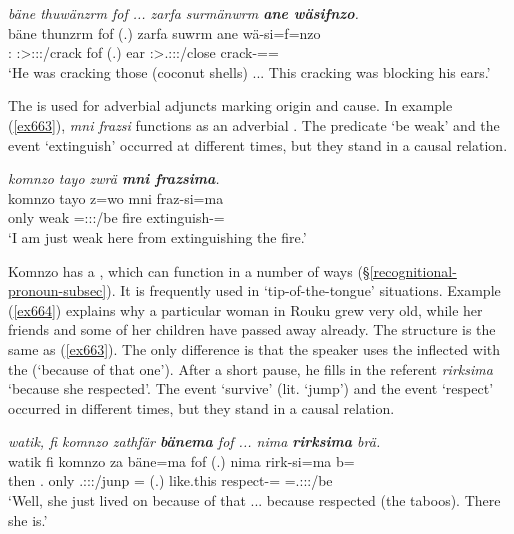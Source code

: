 \begin{exe}
	\ex \emph{bäne thuwänzrm fof ... zarfa surmänwrm \textbf{ane wäsifnzo}.}\\
	\gll bäne thunzrm fof (.) zarfa suwrm ane wä-si=f=nzo\\
	\Dem:\Med{} \Stsg:\Sbj>\Stpl:\Obj:\Pst:\Dur/crack fof (.) ear \Stsg:\Sbj>\Tsg.\Masc:\Obj:\Pst:\Dur/close {\Dem} crack-\Nmlz=\Erg=\Only\\
	\trans `He was cracking those (coconut shells) ... This cracking was blocking his ears.'\\
	\label{ex662}
\end{exe}

The   is used for adverbial adjuncts marking origin and cause. In example (\ref{ex663}), \emph{mni frazsi} functions as an adverbial . The predicate `be weak' and the event `extinguish' occurred at different times, but they stand in a causal relation.

\begin{exe}
	\ex \emph{komnzo tayo zwrä \textbf{mni frazsima}.}\\
	\gll komnzo tayo z=wo mni fraz-si=ma\\
	only weak \Prox=\Fsg:\Sbj:\Nonpast:\Ipfv/be fire extinguish-\Nmlz={\Char}\\
	\trans `I am just weak here from extinguishing the fire.'
	\label{ex663}
\end{exe}

Komnzo has a   , which can function in a number of ways ({\S}\ref{recognitional-pronoun-subsec}). It is frequently used in `tip-of-the-tongue' situations. Example (\ref{ex664}) explains why a particular woman in Rouku grew very old, while her friends and some of her children have passed away already. The structure is the same as (\ref{ex663}). The only difference is that the speaker uses the  inflected with the   (`because of that one'). After a short pause, he fills in the referent \emph{rirksima} `because she respected'. The event `survive' (lit. `jump') and the event `respect' occurred in different times, but they stand in a causal relation.

\begin{exe}
	\ex \emph{watik, fi komnzo zathfär \textbf{bänema} fof ... nima \textbf{rirksima} brä.}\\
	\gll watik fi komnzo za bäne=ma fof (.) nima rirk-si=ma b=\\
	then \Third.{\Abs} only \Tsg.\F:\Sbj:\Rpst:\Pfv/junp \Recog={\Char} {\Emph} (.) {like.this} respect-\Nmlz={\Char} \Med=\Tsg.\F:\Sbj:\Nonpast:\Ipfv/be\\
	\trans `Well, she just lived on because of that ... because respected (the taboos). There she is.'
	\label{ex664}
\end{exe}

